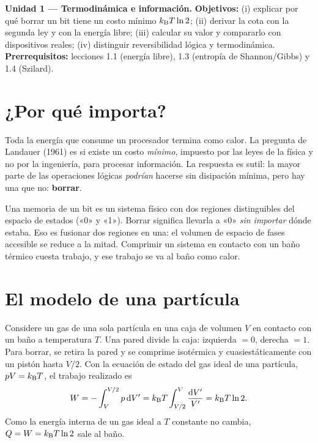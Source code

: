 \documentclass[11pt,a4paper]{article}
\begin{document}

\noindent\textbf{Unidad 1 --- Termodinámica e información.}\quad
\textbf{Objetivos:} (i) explicar por qué borrar un bit tiene un costo mínimo $k_{\mathrm B} T\ln 2$;
(ii) derivar la cota con la segunda ley y con la energía libre; (iii) calcular su valor y compararlo
con dispositivos reales; (iv) distinguir reversibilidad lógica y termodinámica.
\textbf{Prerrequisitos:} lecciones 1.1 (energía libre), 1.3 (entropía de Shannon/Gibbs) y 1.4 (Szilard).

\section{¿Por qué importa?}
Toda la energía que consume un procesador termina como calor. La pregunta de Landauer (1961)
\cite{landauer} es si existe un costo \emph{mínimo}, impuesto por las leyes de la física y no por la
ingeniería, para procesar información. La respuesta es sutil: la mayor parte de las operaciones
lógicas \emph{podrían} hacerse sin disipación mínima, pero hay una que no: \textbf{borrar}.

\begin{intuicion}
Una memoria de un bit es un sistema físico con dos regiones distinguibles del espacio de estados
(«0» y «1»). Borrar significa llevarla a «0» \emph{sin importar} dónde estaba. Eso es fusionar dos
regiones en una: el volumen de espacio de fases accesible se reduce a la mitad. Comprimir un
sistema en contacto con un baño térmico cuesta trabajo, y ese trabajo se va al baño como calor.
\end{intuicion}

\section{El modelo de una partícula}
Considere un gas de una sola partícula en una caja de volumen $V$ en contacto con un baño a
temperatura $T$. Una pared divide la caja: izquierda $=0$, derecha $=1$. Para borrar, se retira la
pared y se comprime isotérmica y cuasiestáticamente con un pistón hasta $V/2$. Con la ecuación de
estado del gas ideal de una partícula, $pV=k_{\mathrm B} T$, el trabajo realizado es
\begin{equation}
W = -\int_V^{V/2} p\,\mathrm{d} V' = k_{\mathrm B} T \int_{V/2}^{V}\frac{\mathrm{d} V'}{V'} = k_{\mathrm B} T\ln 2 .
\end{equation}
Como la energía interna de un gas ideal a $T$ constante no cambia, $Q=W=k_{\mathrm B} T\ln 2$ sale al baño.
\end{document}
